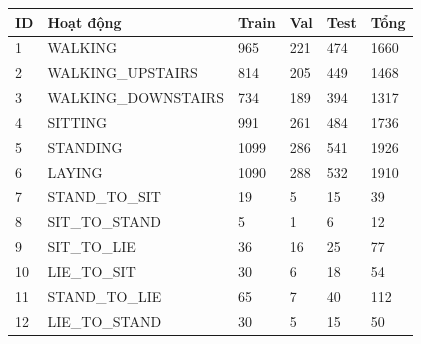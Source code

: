 \begin{tabular}{llllll}
\toprule
ID & Hoạt động & Train & Val & Test & Tổng \\
\midrule
1 & WALKING & 965 & 221 & 474 & 1660 \\
2 & WALKING\_UPSTAIRS & 814 & 205 & 449 & 1468 \\
3 & WALKING\_DOWNSTAIRS & 734 & 189 & 394 & 1317 \\
4 & SITTING & 991 & 261 & 484 & 1736 \\
5 & STANDING & 1099 & 286 & 541 & 1926 \\
6 & LAYING & 1090 & 288 & 532 & 1910 \\
7 & STAND\_TO\_SIT & 19 & 5 & 15 & 39 \\
8 & SIT\_TO\_STAND & 5 & 1 & 6 & 12 \\
9 & SIT\_TO\_LIE & 36 & 16 & 25 & 77 \\
10 & LIE\_TO\_SIT & 30 & 6 & 18 & 54 \\
11 & STAND\_TO\_LIE & 65 & 7 & 40 & 112 \\
12 & LIE\_TO\_STAND & 30 & 5 & 15 & 50 \\
\bottomrule
\end{tabular}
